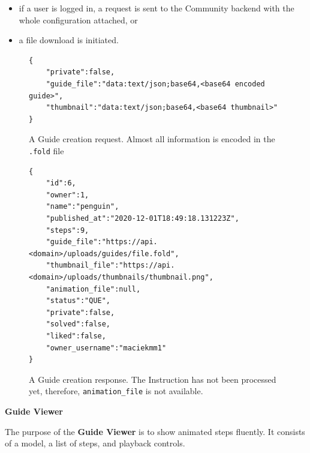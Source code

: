 \begin{itemize}
	\item if a user is logged in, a request is sent to the Community backend with the whole configuration attached, or
	\item a file download is initiated.
\end{itemize}

\begin{figure}[H]
	\caption{A Guide creation request. Almost all information is encoded in the \texttt{.fold} file}
	\begin{lstlisting}
{
	"private":false,
	"guide_file":"data:text/json;base64,<base64 encoded guide>",
	"thumbnail":"data:text/json;base64,<base64 thumbnail>"
}
	\end{lstlisting}
\end{figure}

\begin{figure}[H]
	\caption{A Guide creation response. The Instruction has not been processed yet, therefore, \texttt{animation\_file} is not available.}
	\label{guide-response}
	\begin{lstlisting}
{
	"id":6,
	"owner":1,
	"name":"penguin",
	"published_at":"2020-12-01T18:49:18.131223Z",
	"steps":9,
	"guide_file":"https://api.<domain>/uploads/guides/file.fold",
	"thumbnail_file":"https://api.<domain>/uploads/thumbnails/thumbnail.png",
	"animation_file":null,
	"status":"QUE",
	"private":false,
	"solved":false,
	"liked":false,
	"owner_username":"maciekmm1"
}
	\end{lstlisting}
\end{figure}


\textbf{Guide Viewer}

The purpose of the \textbf{Guide Viewer} is to show animated steps fluently. It consists of a model, a list of steps, and playback controls.

